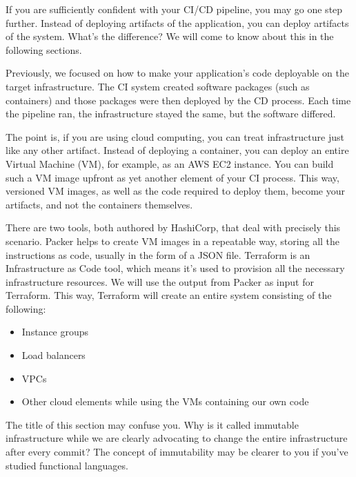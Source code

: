 
If you are sufficiently confident with your CI/CD pipeline, you may go one step further. Instead of deploying artifacts of the application, you can deploy artifacts of the system. What's the difference? We will come to know about this in the following sections.


Previously, we focused on how to make your application's code deployable on the target infrastructure. The CI system created software packages (such as containers) and those packages were then deployed by the CD process. Each time the pipeline ran, the infrastructure stayed the same, but the software differed.

The point is, if you are using cloud computing, you can treat infrastructure just like any other artifact. Instead of deploying a container, you can deploy an entire Virtual Machine (VM), for example, as an AWS EC2 instance. You can build such a VM image upfront as yet another element of your CI process. This way, versioned VM images, as well as the code required to deploy them, become your artifacts, and not the containers themselves.

There are two tools, both authored by HashiCorp, that deal with precisely this scenario. Packer helps to create VM images in a repeatable way, storing all the instructions as code, usually in the form of a JSON file. Terraform is an Infrastructure as Code tool, which means it's used to provision all the necessary infrastructure resources. We will use the output from Packer as input for Terraform. This way, Terraform will create an entire system consisting of the following:

\begin{itemize}
\item 
Instance groups

\item 
Load balancers

\item 
VPCs

\item 
Other cloud elements while using the VMs containing our own code
\end{itemize}

The title of this section may confuse you. Why is it called immutable infrastructure while we are clearly advocating to change the entire infrastructure after every commit? The concept of immutability may be clearer to you if you've studied functional languages.

